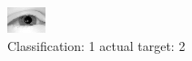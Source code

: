 \begin{figure}[h!]
\begin{center}
\includegraphics[width=0.60\columnwidth]{figures/ID2239_class_1_target_2.png}
\end{center}
\caption{ Classification: 1 actual target: 2}
\label{fig:ID2239_class_1_target_2}
\end{figure}
